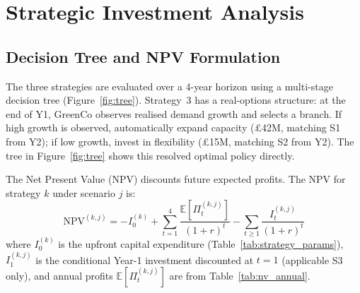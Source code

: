 \documentclass[10pt,a4paper]{article}
\newcommand{\E}{\mathbb{E}}
\begin{document}
\section{Strategic Investment Analysis}


\subsection{Decision Tree and NPV Formulation}
\label{sec:decision_tree}

The three strategies are evaluated over a 4-year horizon using a multi-stage decision tree (Figure~\ref{fig:tree}). Strategy~3 has a real-options structure: at the end of Y1, GreenCo observes realised demand growth and selects a branch. If high growth is observed, automatically expand capacity (\pounds42M, matching S1 from Y2); if low growth, invest in flexibility (\pounds15M, matching S2 from Y2). The tree in Figure~\ref{fig:tree} shows this resolved optimal policy directly.

The Net Present Value (NPV) discounts future expected profits. The NPV for strategy $k$ under scenario $j$ is:
\begin{equation}
    \mathrm{NPV}^{(k,j)} = -I_0^{(k)} + \sum_{t=1}^{4}\frac{\E[\Pi_t^{(k,j)}]}{(1+r)^t} - \sum_{t\geq 1}\frac{I_t^{(k,j)}}{(1+r)^t}
    \label{eq:npv}
\end{equation}
where $I_0^{(k)}$ is the upfront capital expenditure (Table~\ref{tab:strategy_params}), $I_1^{(k,j)}$ is the conditional Year-1 investment discounted at $t=1$ (applicable S3 only), and annual profits $\E[\Pi_t^{(k,j)}]$ are from Table~\ref{tab:nv_annual}.
\end{document}
